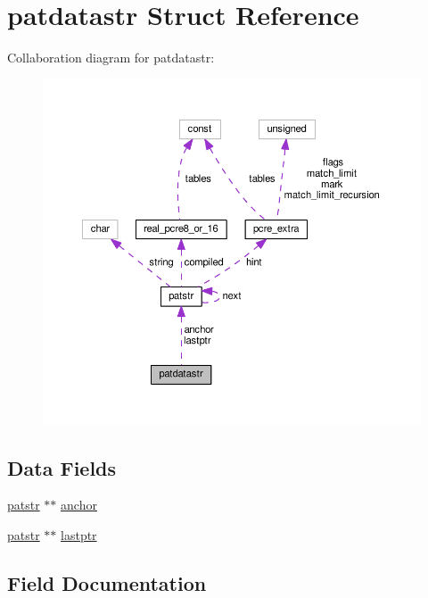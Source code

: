 \hypertarget{structpatdatastr}{}\section{patdatastr Struct Reference}
\label{structpatdatastr}


Collaboration diagram for patdatastr\+:
\nopagebreak
\begin{figure}[H]
\begin{center}
\leavevmode
\includegraphics[width=350pt]{structpatdatastr__coll__graph}
\end{center}
\end{figure}
\subsection*{Data Fields}
\begin{DoxyCompactItemize}
\item 
\hyperlink{structpatstr}{patstr} $\ast$$\ast$ \hyperlink{structpatdatastr_a6ac27ae344e2e27c4a4b69de2d9ccdc6}{anchor}
\item 
\hyperlink{structpatstr}{patstr} $\ast$$\ast$ \hyperlink{structpatdatastr_a7a587ec22f33290ab99ea2320b3d45e1}{lastptr}
\end{DoxyCompactItemize}


\subsection{Field Documentation}
